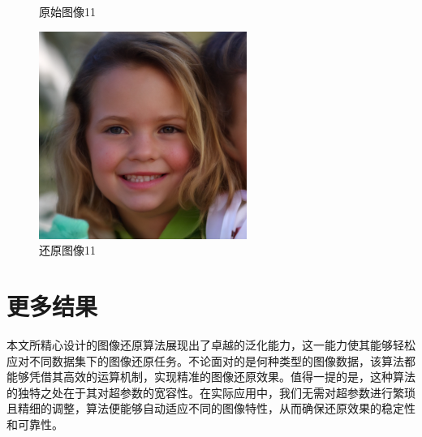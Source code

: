 \begin{figure}[H]
\begin{minipage}[b]{0.3\linewidth}
    \caption{原始图像11}
    \label{original image }
  \end{minipage}
\hspace{0.1cm}
  \begin{minipage}[b]{0.3\linewidth}
    \includegraphics[width=\linewidth]{Picture/recon/00006.png}
    \caption{还原图像11}
    \label{inpainted image}
  \end{minipage}
\end{figure}


\section{更多结果}
本文所精心设计的图像还原算法展现出了卓越的泛化能力，这一能力使其能够轻松应对不同数据集下的图像还原任务。不论面对的是何种类型的图像数据，该算法都能够凭借其高效的运算机制，实现精准的图像还原效果。值得一提的是，这种算法的独特之处在于其对超参数的宽容性。在实际应用中，我们无需对超参数进行繁琐且精细的调整，算法便能够自动适应不同的图像特性，从而确保还原效果的稳定性和可靠性。    


